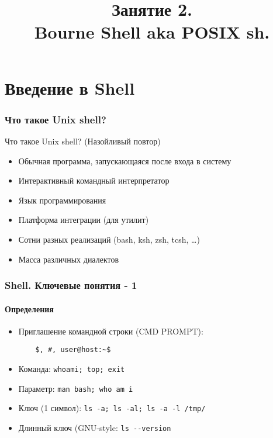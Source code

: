 


\title[SaM Solutions. Linux QA Training]
{
  Занятие 2.\\
  Bourne Shell aka POSIX sh.
}


\begin{frame}
  \titlepage
\end{frame}

\section{Введение в Shell}

\begin{frame}
  \frametitle{Что такое Unix shell?}
  
  \alert{Что такое Unix shell? (Назойливый повтор)}

  \begin{itemize}
    \item Обычная программа, запускающаяся после входа в систему
    \item Интерактивный командный интерпретатор
    \item Язык программирования
    \item Платформа интеграции (для утилит)
    \item Сотни разных реализаций (bash, ksh, zsh, tcsh, \ldots )
    \item Масса различных диалектов
  \end{itemize}

\end{frame}

\begin{frame}[fragile]
  \frametitle{Shell. Ключевые понятия - 1}
  \framesubtitle{Определения}

  \begin{itemize}
    \item \alert{Приглашение командной строки (CMD PROMPT)}: \pause 
      \begin{verbatim}
	$, #, user@host:~$
      \end{verbatim} \pause
    \item \alert{Команда}: \newline \verb+whoami; top; exit+ \pause
    \item \alert{Параметр}: \newline \verb+man bash; who am i+ \pause
    \item \alert{Ключ (1 символ)}: \newline \verb+ls -a; ls -al; ls -a -l /tmp/+ \pause
    \item \alert{Длинный ключ (GNU-style}: \newline \verb+ls --version+
  \end{itemize}
\end{frame}

